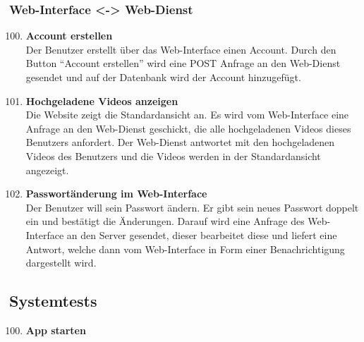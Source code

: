 \subsubsection{Web-Interface <-> Web-Dienst}
\begin{enumerate}[\bfseries{T}10]  
\setcounter{enumi}{99}{}

\item \textbf{Account erstellen} \hfill\\
Der Benutzer erstellt \"uber das Web-Interface einen Account. Durch den Button ``Account erstellen'' wird eine POST Anfrage an den Web-Dienst gesendet und auf der Datenbank wird der Account hinzugef\"ugt.

\item \textbf{Hochgeladene Videos anzeigen} \hfill\\
Die Website zeigt die Standardansicht an. Es wird vom Web-Interface eine Anfrage an den Web-Dienst geschickt, die alle hochgeladenen Videos dieses Benutzers anfordert. Der Web-Dienst antwortet mit den hochgeladenen Videos des Benutzers und die Videos werden in der Standardansicht angezeigt. 

\item \textbf{Passwort\"anderung im Web-Interface} \hfill\\
Der Benutzer will sein Passwort \"andern. Er gibt sein neues Passwort doppelt ein und best\"atigt die \"Anderungen. Darauf wird eine Anfrage des Web-Interface an den Server gesendet, dieser bearbeitet diese und liefert eine Antwort, welche dann vom Web-Interface in Form einer Benachrichtigung dargestellt wird.

\end{enumerate}

\subsection{Systemtests}
\begin{enumerate}[\bfseries{T}10]  
\setcounter{enumi}{99}{}

\item \textbf{App starten} \hfill\\  
\end{enumerate}
